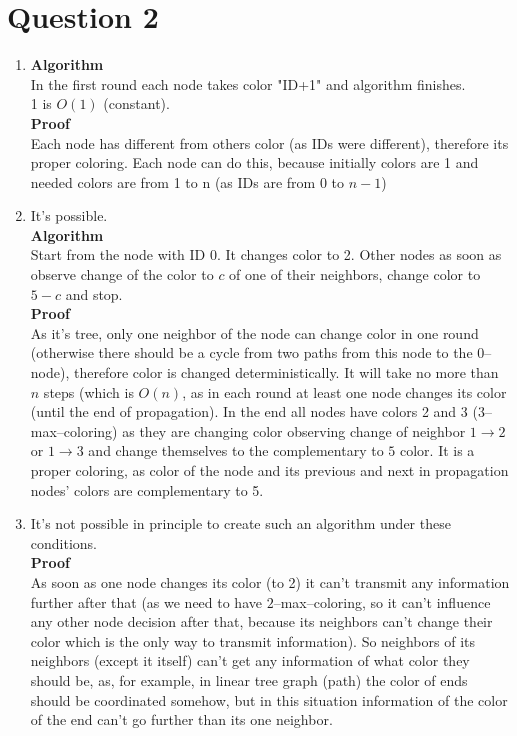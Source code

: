 \documentclass[]{article}
\title{}
\author{}
\begin{document}

\section*{Question 2}
\begin{enumerate}
	\item \textbf{Algorithm}\\
	In the first round each node takes color "ID+1" and algorithm finishes. \\
	1 is $O(1)$ (constant).\\ 
	\textbf{Proof}\\ 
	Each node has different from others color (as IDs were different), therefore its proper coloring. Each node can do this, because initially colors are 1 and needed colors are from 1 to n (as IDs are from $0$ to $n-1$)
	
	\item
		It's possible. \\ 
		\textbf{Algorithm}\\
		Start from the node with ID 0. It changes color to 2. Other nodes as soon as observe change of the color to $c$ of one of their neighbors, change color to $5-c$ and stop.\\
		\textbf{Proof}\\
		As it's tree, only one neighbor of the node can change color in one round (otherwise there should be a cycle from two paths from this node to the 0--node), therefore color is changed deterministically. It will take no more than $n$ steps (which is $O(n)$, as in each round at least one node changes its color (until the end of propagation). In the end all nodes have colors 2 and 3 ($3$--max--coloring) as they are changing color observing change of neighbor $1\rightarrow2$ or $1\rightarrow3$ and change themselves to the complementary to $5$ color. It is a proper coloring, as color of the node and its previous and next in propagation nodes' colors are complementary to 5.
		
		\item
		It's not possible in principle to create such an algorithm under these conditions.\\
		\textbf{Proof}\\
		As soon as one node changes its color (to 2) it can't transmit any information further after that (as we need to have $2$--max--coloring, so it can't influence any other node decision after that, because its neighbors can't change their color which is the only way to transmit information). So neighbors of its neighbors (except it itself) can't get any information of what color they should be, as, for example, in linear tree graph (path) the color of ends should be coordinated somehow, but in this situation information of the color of the end can't go further than its one neighbor.
		

\end{enumerate}
\end{document}
